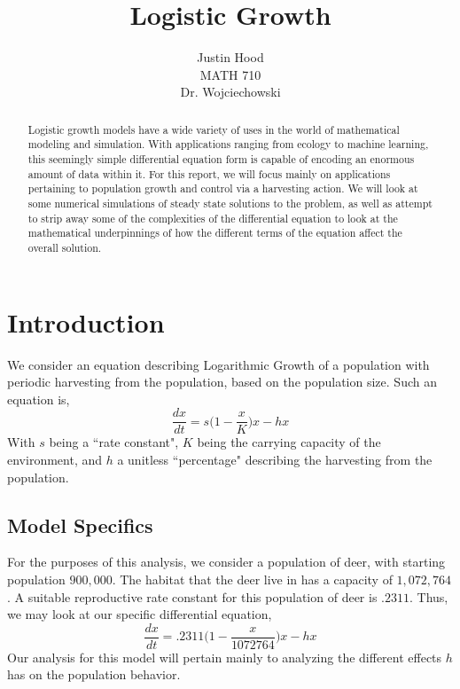 \documentclass[letterpaper,12pt]{article}
\title{Logistic Growth}
\author{Justin Hood\\
MATH 710\\
Dr. Wojciechowski}
\begin{document}
\maketitle
\begin{abstract}
Logistic growth models have a wide variety of uses in the world of mathematical modeling and simulation. With applications ranging from ecology to machine learning, this seemingly simple differential equation form is capable of encoding an enormous amount of data within it. For this report, we will focus mainly on applications pertaining to population growth and control via a harvesting action. We will look at some numerical simulations of steady state solutions to the problem, as well as attempt to strip away some of the complexities of the differential equation to look at the mathematical underpinnings of how the different terms of the equation affect the overall solution.
\end{abstract}
\newpage
\section{Introduction}
We consider an equation describing Logarithmic Growth of a population with periodic harvesting from the population, based on the population size. Such an equation is,
\[\frac{dx}{dt}=s\bigg(1-\frac{x}{K}\bigg)x-hx\]
With $s$ being a ``rate constant", $K$ being the carrying capacity of the environment, and $h$ a unitless ``percentage" describing the harvesting from the population.
\subsection{Model Specifics}
For the purposes of this analysis, we consider a population of deer, with starting population $900,000$. The habitat that the deer live in has a capacity of $1,072,764$. A suitable reproductive rate constant for this population of deer is $.2311$. Thus, we may look at our specific differential equation,
\[\frac{dx}{dt}=.2311\bigg(1-\frac{x}{1072764}\bigg)x-hx\]
Our analysis for this model will pertain mainly to analyzing the different effects $h$ has on the population behavior.
\end{document}
